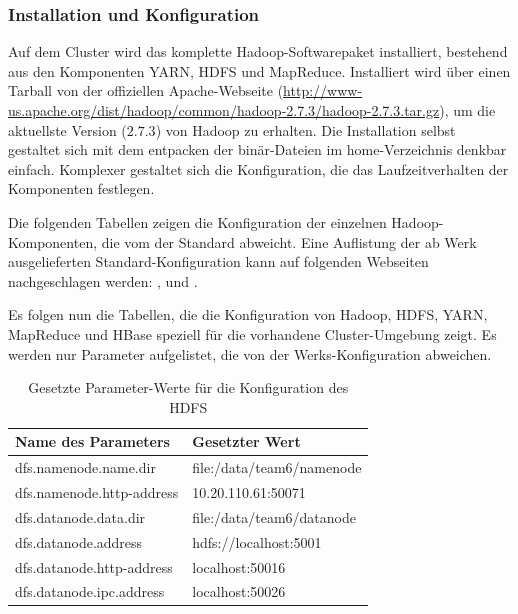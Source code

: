 \subsubsection{Installation und Konfiguration}
Auf dem Cluster wird das komplette Hadoop-Softwarepaket installiert, bestehend aus den
Komponenten \ac{YARN}, \ac{HDFS} und MapReduce. Installiert wird über einen Tarball von der offiziellen
Apache-Webseite (\url{http://www-us.apache.org/dist/hadoop/common/hadoop-2.7.3/hadoop-2.7.3.tar.gz}), um die aktuellste Version ($2.7.3$) von Hadoop zu erhalten. Die Installation selbst gestaltet sich mit dem entpacken der binär-Dateien im home-Verzeichnis 
denkbar einfach. Komplexer gestaltet sich die Konfiguration, die das Laufzeitverhalten der Komponenten festlegen.

Die folgenden Tabellen zeigen die Konfiguration der einzelnen Hadoop-Komponenten, die vom der Standard abweicht.
Eine Auflistung der ab Werk ausgelieferten Standard-Konfiguration kann auf folgenden Webseiten nachgeschlagen werden:
\cite{hdfsDefault}, \cite{yarnDefault} und \cite{mapreduceDefault}.

Es folgen nun die Tabellen, die die Konfiguration von Hadoop, HDFS, YARN, MapReduce und HBase 
speziell für die vorhandene Cluster-Umgebung zeigt. Es werden  nur Parameter aufgelistet, 
die von der Werks-Konfiguration abweichen.

\begin{table}
	\begin{tabularx}{\textwidth}{| X | X |} \hline
		Name des Parameters & Gesetzter Wert \\ \hline
		dfs.namenode.name.dir & file:/data/team6/namenode \\ \hline
		dfs.namenode.http-address & 10.20.110.61:50071  \\ \hline
		dfs.datanode.data.dir & file:/data/team6/datanode \\ \hline
		dfs.datanode.address & hdfs://localhost:5001 \\ \hline
		dfs.datanode.http-address & localhost:50016 \\ \hline
		dfs.datanode.ipc.address & localhost:50026 \\ \hline
	\end{tabularx}
	\caption{Gesetzte Parameter-Werte für die Konfiguration des HDFS}
	\label{config:hdfsValues}
\end{table}

